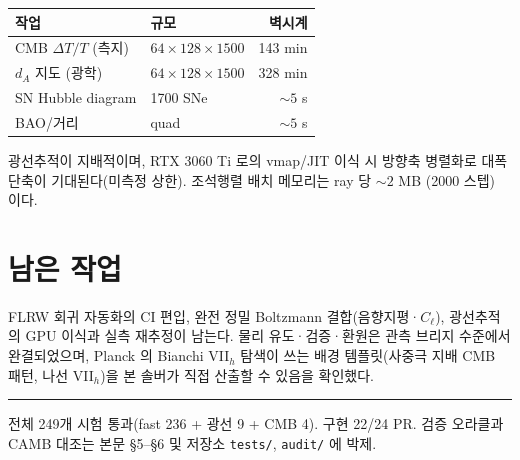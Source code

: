 \documentclass[11pt]{article}
\begin{document}
\begin{center}
\begin{tabular}{@{}llr@{}}
\toprule
작업 & 규모 & 벽시계 \\
\midrule
CMB $\Delta T/T$ (측지) & $64\times128\times1500$ & 143 min \\
$d_A$ 지도 (광학) & $64\times128\times1500$ & 328 min \\
SN Hubble diagram & 1700 SNe & $\sim5$ s \\
BAO/거리 & quad & $\sim5$ s \\
\bottomrule
\end{tabular}
\end{center}

광선추적이 지배적이며, RTX 3060 Ti 로의 vmap/JIT 이식 시 방향축 병렬화로 대폭 단축이
기대된다(미측정 상한). 조석행렬 배치 메모리는 ray 당 $\sim2$ MB (2000 스텝) 이다.

\section{남은 작업}

FLRW 회귀 자동화의 CI 편입, 완전 정밀 Boltzmann 결합(음향지평·$C_\ell$), 광선추적의
GPU 이식과 실측 재추정이 남는다. 물리 유도·검증·환원은 관측 브리지 수준에서 완결되었으며,
Planck 의 Bianchi VII$_h$ 탐색이 쓰는 배경 템플릿(사중극 지배 CMB 패턴, 나선 VII$_h$)을
본 솔버가 직접 산출할 수 있음을 확인했다.

\vspace{1em}\hrule\vspace{0.5em}
{\small 전체 249개 시험 통과(fast 236 + 광선 9 + CMB 4). 구현 22/24 PR.
검증 오라클과 CAMB 대조는 본문 \S5--\S6 및 저장소 \texttt{tests/}, \texttt{audit/} 에 박제.}
\end{document}

